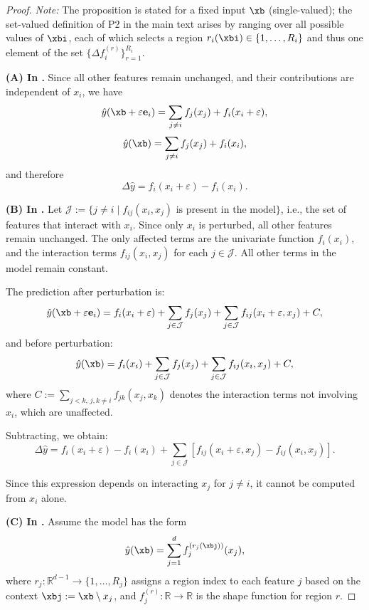 \begin{proof}

\textit{Note:} The proposition is stated for a fixed input $\xb$ (single-valued); the set-valued definition of P2 in the main text arises by ranging over all possible values of $\xbi$, each of which selects a region $r_i(\xbi) \in \{1, \dots, R_i\}$ and thus one element of the set $\{\Delta f_i^{(r)}\}_{r=1}^{R_i}$.

\textbf{(A) In \gam.}
Since all other features remain unchanged, and their contributions are independent of \( x_i \), we have
\[
\hat{y}(\xb + \varepsilon \mathbf{e}_i) = \sum_{j \neq i} f_j(x_j) + f_i(x_i + \varepsilon),
\]
\[
\hat{y}(\xb) = \sum_{j \neq i} f_j(x_j) + f_i(x_i),
\]
and therefore
\[
\Delta \hat{y} = f_i(x_i + \varepsilon) - f_i(x_i). 
\]

\textbf{(B) In \gamm.}
Let \( \mathcal{J} := \{ j \ne i \mid f_{ij}(x_i, x_j) \text{ is present in the model} \} \), i.e., the set of features that interact with \( x_i \). Since only \( x_i \) is perturbed, all other features remain unchanged. The only affected terms are the univariate function \( f_i(x_i) \), and the interaction terms \( f_{ij}(x_i, x_j) \) for each \( j \in \mathcal{J} \). All other terms in the model remain constant.

The prediction after perturbation is:
\[
\hat{y}(\xb + \varepsilon \mathbf{e}_i) = f_i(x_i + \varepsilon) + \sum_{j \in \mathcal{J}} f_j(x_j) + \sum_{j \in \mathcal{J}} f_{ij}(x_i + \varepsilon, x_j) + C,
\]
and before perturbation:
\[
\hat{y}(\xb) = f_i(x_i) + \sum_{j \in \mathcal{J}} f_j(x_j) + \sum_{j \in \mathcal{J}} f_{ij}(x_i, x_j) + C,
\]
where \( C := \sum_{j<k,\, j,k \ne i} f_{jk}(x_j, x_k) \) denotes the interaction terms not involving \( x_i \), which are unaffected.

Subtracting, we obtain:
\[
\Delta \hat{y} = f_i(x_i + \varepsilon) - f_i(x_i) + \sum_{j \in \mathcal{J}} \left[ f_{ij}(x_i + \varepsilon, x_j) - f_{ij}(x_i, x_j) \right].
\]

Since this expression depends on interacting \( x_j \) for \( j \ne i \), it cannot be computed from \( x_i \) alone. 

\textbf{(C) In \method{}.}
Assume the model has the form
\[
\hat{y}(\xb) = \sum_{j=1}^d f_j^{(r_j(\xbj))}(x_j),
\]
where \( r_j : \mathbb{R}^{d-1} \to \{1, \dots, R_j\} \) assigns a region index to each feature \( j \) based on the context \( \xbj := \xb \setminus x_j \), and \( f_j^{(r)} : \mathbb{R} \to \mathbb{R} \) is the shape function for region \( r \).


\end{proof}
